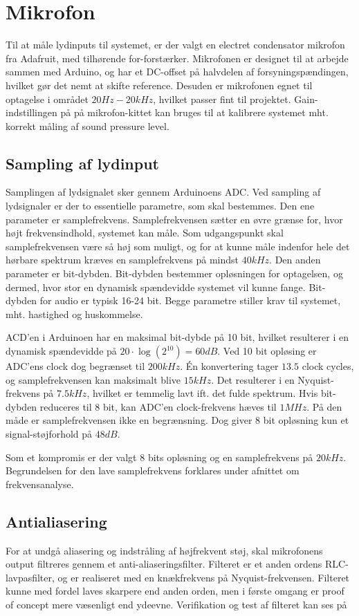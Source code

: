 \section{Mikrofon}
Til at måle lydinputs til systemet, er der valgt en electret condensator mikrofon fra Adafruit, med tilhørende for-forstærker. %
Mikrofonen er designet til at arbejde sammen med Arduino, og har et DC-offset på halvdelen af forsyningspændingen, hvilket gør det nemt at skifte reference. 
Desuden er mikrofonen egnet til optagelse i området $20 Hz - 20 kHz$, hvilket passer fint til projektet. 
Gain-indstillingen på på mikrofon-kittet kan bruges til at kalibrere systemet mht. korrekt måling af sound pressure level. 

\subsection{Sampling af lydinput}
Samplingen af lydsignalet sker gennem Arduinoens ADC. 
Ved sampling af lydsignaler er der to essentielle parametre, som skal bestemmes.
Den ene parameter er samplefrekvens. 
Samplefrekvensen sætter en øvre grænse for, hvor højt frekvensindhold, systemet kan måle. 
Som udgangspunkt skal samplefrekvensen være så høj som muligt, og for at kunne måle indenfor hele det hørbare spektrum kræves en samplefrekvens på mindst $40 kHz$. 
Den anden parameter er bit-dybden.
Bit-dybden bestemmer opløsningen for optagelsen, og dermed, hvor stor en dynamisk spændevidde systemet vil kunne fange. 
Bit-dybden for audio er typisk 16-24 bit. 
Begge parametre stiller krav til systemet, mht. hastighed og huskommelse. 

ACD'en i Arduinoen har en maksimal bit-dybde på 10 bit, hvilket resulterer i en dynamisk spændevidde på $ 20 \cdot \log (2^{10}) = 60 dB$. 
Ved 10 bit opløsing er ADC'ens clock dog begrænset til $200 kHz$. 
Én konvertering tager $13.5$ clock cycles, og samplefrekvensen kan maksimalt blive $ 15 kHz$.
Det resulterer i en Nyquist-frekvens på $7.5 kHz$, hvilket er temmelig lavt ift. det fulde spektrum. 
Hvis bit-dybden reduceres til 8 bit, kan ADC'en clock-frekvens hæves til $1 MHz$. 
På den måde er samplefrekvensen ikke en begrænsning. 
Dog giver 8 bit opløsning kun et signal-støjforhold på $48 dB$. 

Som et kompromis er der valgt 8 bits opløsning og en samplefrekvens på $20 kHz$.
Begrundelsen for den lave samplefrekvens forklares under afnittet om frekvensanalyse. 

\subsection{Antialiasering}
For at undgå aliasering og indstråling af højfrekvent støj, skal mikrofonens output filtreres gennem et anti-aliaseringsfilter.
Filteret er et anden ordens RLC-lavpasfilter, og er realiseret med en knækfrekvens på Nyquist-frekvensen. 
Filteret kunne med fordel laves skarpere end anden orden, men i første omgang er proof of concept mere væsenligt end ydeevne. 
Verifikation og test af filteret kan ses på %

